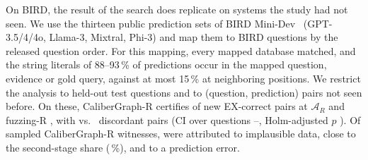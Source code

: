 On BIRD, the result of the search does replicate on systems the study had not seen. We use the thirteen public prediction sets of BIRD Mini-Dev~\cite{birdminidev,li2023bird} (GPT-3.5/4/4o, Llama-3, Mixtral, Phi-3) and map them to BIRD questions by the released question order. For this mapping, every mapped database matched, and the string literals of 88--93\,\% of predictions occur in the mapped question, evidence or gold query, against at most 15\,\% at neighboring positions. We restrict the analysis to held-out test questions and to (question, prediction) pairs not seen before. On these, CaliberGraph-R certifies  of  new EX-correct pairs at $\mathcal A_R$ and fuzzing-R , with  vs.\  discordant pairs (CI over questions --, Holm-adjusted $p$ ). Of  sampled CaliberGraph-R witnesses,  were attributed to implausible data, close to the second-stage share (\,\%), and  to a prediction error.


